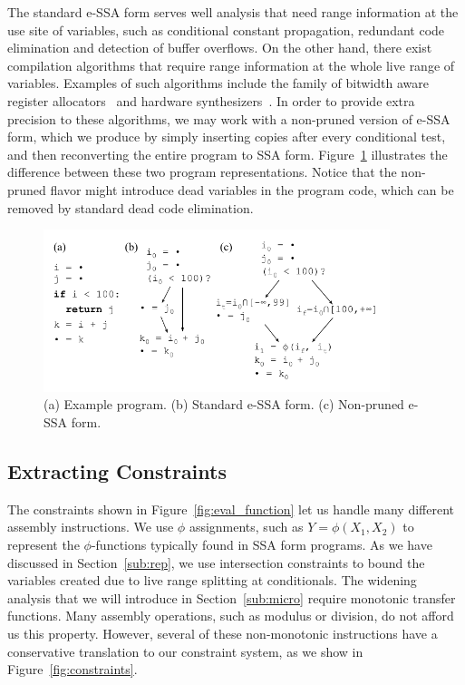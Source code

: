 \documentclass{llncs}
\begin{document}
The standard e-SSA form serves well analysis that need range information
at the use site of variables, such as conditional constant propagation,
redundant code elimination and detection of buffer overflows.
On the other hand, there exist compilation algorithms that require range
information at the whole live range of variables.
Examples of such algorithms include the family of
bitwidth aware register allocators~\cite{Barik06,Tallam03,Pereira08} and
hardware synthesizers~\cite{Cong05,Mahlke01,Stephenson00}.
In order to provide extra precision to these algorithms, we may work with a
non-pruned version of e-SSA form, which we produce by simply inserting copies
after every conditional test, and then reconverting the entire program to
SSA form.
Figure~\ref{fig:ex_non_pruned} illustrates the difference between these two
program representations.
Notice that the non-pruned flavor might introduce dead variables in the
program code, which can be removed by standard dead code elimination.

\begin{figure}[t!]
\begin{center}
\includegraphics[width=0.9\textwidth]{images/ex_non_pruned}
\end{center}
\caption{\label{fig:ex_non_pruned}
(a) Example program.
(b) Standard e-SSA form.
(c) Non-pruned e-SSA form.}
\end{figure}

\subsection{Extracting Constraints}
\label{sub:constraints}

The constraints shown in Figure~\ref{fig:eval_function} let us handle
many different assembly instructions.
We use $\phi$ assignments, such as $Y = \phi(X_1, X_2)$ to represent
the $\phi$-functions typically found in SSA form programs.
As we have discussed in Section~\ref{sub:rep}, we use intersection
constraints to bound the variables created due to live range splitting
at conditionals.
The widening analysis that we will introduce in Section~\ref{sub:micro}
require monotonic transfer functions.
Many assembly operations, such as modulus or division, do not afford us
this property.
However, several of these non-monotonic instructions have a conservative
translation to our constraint system, as we show in
Figure~\ref{fig:constraints}.
\end{document}
